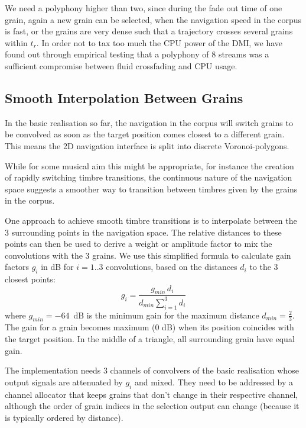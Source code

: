 We need a polyphony higher than two, since during the fade out time of one grain, again a new grain can be selected, when the navigation speed in the corpus is fast, or the grains are very dense such that a trajectory crosses several grains within $t_r$. In order not to tax too much the CPU power of the DMI, we have found out through empirical testing that a polyphony of 8 streams was a sufficient compromise between fluid crossfading and CPU usage.

\subsection{Smooth Interpolation Between Grains}\label{sec:mix}

In the basic realisation so far, the navigation in the corpus will switch grains to be convolved as soon as the target position comes closest to a different grain.  
This means the 2D navigation interface is split into discrete Voronoi-polygons.

While for some musical aim this might be appropriate, for instance the creation of rapidly switching timbre transitions, the continuous nature of the navigation space suggests a smoother way to transition between timbres given by the grains in the corpus.

One approach to achieve smooth timbre transitions is to interpolate between the 3 surrounding points in the navigation space.  The relative distances to these points can then be used to derive a weight or amplitude factor \cite{FreedMacCallumSchmederWessel-nime2010-hybridization-interfaces} to mix the convolutions with the 3 grains.  We use this simplified formula to calculate gain factors $g_i$ in dB for $i = 1..3$ convolutions, based on the distances $d_i$ to the 3 closest points:
%
\begin{equation}
  g_i = \frac{g_{min} \, d_i}{d_{min} \sum_{i=1}^3 d_i}
\end{equation}
%
where $g_{min} = -64$~dB is the minimum gain for the maximum distance $d_{min} = \frac{2}{3}$.
The gain for a grain becomes maximum (0 dB) when its position coincides with the target position. In the middle of a triangle, all surrounding grain have equal gain.

The implementation needs 3 channels of convolvers of the basic realisation whose output signals are attenuated by $g_i$ and mixed.  They need to be addressed by a channel allocator that keeps grains that don't change in their respective channel, although the order of grain indices in the selection output can change (because it is typically ordered by distance).

